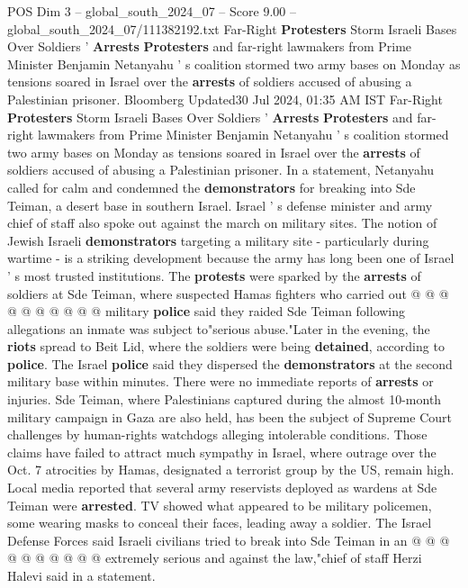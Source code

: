 \begin{textsample}{POS Dim 3 – global\_south\_2024\_07 – Score 9.00 – global\_south\_2024\_07/111382192.txt}  \label{ex:f3_pos_314}
Far-Right \textbf{Protesters} Storm Israeli Bases Over Soldiers ' \textbf{Arrests} \textbf{Protesters} and far-right lawmakers from Prime Minister Benjamin Netanyahu ' s coalition stormed two army bases on Monday as tensions soared in Israel over the \textbf{arrests} of soldiers accused of abusing a Palestinian prisoner.
Bloomberg Updated30 Jul 2024, 01:35 AM IST Far-Right \textbf{Protesters} Storm Israeli Bases Over Soldiers ' \textbf{Arrests} \textbf{Protesters} and far-right lawmakers from Prime Minister Benjamin Netanyahu ' s coalition stormed two army bases on Monday as tensions soared in Israel over the \textbf{arrests} of soldiers accused of abusing a Palestinian prisoner.
In a statement, Netanyahu called for calm and condemned the \textbf{demonstrators} for breaking into Sde Teiman, a desert base in southern Israel.
Israel ' s defense minister and army chief of staff also spoke out against the march on military sites.
The notion of Jewish Israeli \textbf{demonstrators} targeting a military site - particularly during wartime - is a striking development because the army has long been one of Israel ' s most trusted institutions.
The \textbf{protests} were sparked by the \textbf{arrests} of soldiers at Sde Teiman, where suspected Hamas fighters who carried out @ @ @ @ @ @ @ @ @ @ military \textbf{police} said they raided Sde Teiman following allegations an inmate was subject to"serious abuse."Later in the evening, the \textbf{riots} spread to Beit Lid, where the soldiers were being \textbf{detained}, according to \textbf{police}.
The Israel \textbf{police} said they dispersed the \textbf{demonstrators} at the second military base within minutes.
There were no immediate reports of \textbf{arrests} or injuries.
Sde Teiman, where Palestinians captured during the almost 10-month military campaign in Gaza are also held, has been the subject of Supreme Court challenges by human-rights watchdogs alleging intolerable conditions.
Those claims have failed to attract much sympathy in Israel, where outrage over the Oct. 7 atrocities by Hamas, designated a terrorist group by the US, remain high.
Local media reported that several army reservists deployed as wardens at Sde Teiman were \textbf{arrested}.
TV showed what appeared to be military policemen, some wearing masks to conceal their faces, leading away a soldier.
The Israel Defense Forces said Israeli civilians tried to break into Sde Teiman in an @ @ @ @ @ @ @ @ @ @ extremely serious and against the law,"chief of staff Herzi Halevi said in a statement.

\end{textsample}
